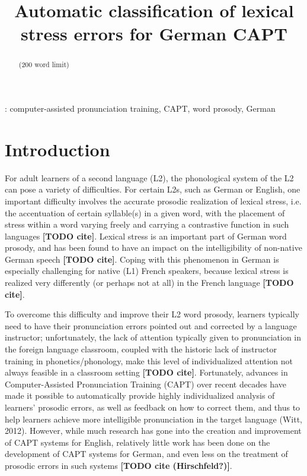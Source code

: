 \documentclass[a4paper]{article}
\title{Automatic classification of lexical stress errors for German CAPT}
\newcommand{\TODO}[1]{{\color{red}\textbf{[TODO #1]}}}
\begin{document}
  \maketitle
  \begin{abstract}
  
    (200 word limit) 
  
    
    
    
  \end{abstract}
  : computer-assisted pronunciation training, CAPT, word prosody, German


  \section{Introduction}
  
  \cite{Vakil2015}
  
  For adult learners of a second language (L2), the phonological system of the L2 can pose a variety of difficulties. For certain L2s, such as German or English, one important difficulty involves the accurate prosodic realization of lexical stress, i.e. the accentuation of certain syllable(s) in a given word, with the placement of stress within a word varying freely and carrying a contrastive function in such languages \TODO{cite}. Lexical stress is an important part of German word prosody, and has been found to have an impact on the intelligibility of non-native German speech \TODO{cite}. Coping with this phenomenon in German is especially challenging for native (L1) French speakers, because lexical stress is realized very differently (or perhaps not at all) in the French language \TODO{cite}.
  
  To overcome this difficulty and improve their L2 word prosody, learners typically need to have their pronunciation errors pointed out and corrected by a language instructor; unfortunately, the lack of attention typically given to pronunciation in the foreign language classroom, coupled with the historic lack of instructor training in phonetics/phonology, make this level of individualized attention not always feasible in a classroom setting \TODO{cite}. Fortunately, advances in Computer-Assisted Pronunciation Training (CAPT) over recent decades have made it possible to automatically provide highly individualized analysis of learners' prosodic errors, as well as feedback on how to correct them, and thus to help learners achieve more intelligible pronunciation in the target language (Witt, 2012). However, while much research has gone into the creation and improvement of CAPT systems for English, relatively little work has been done on the development of CAPT systems for German, and even less on the treatment of prosodic errors in such systems \TODO{cite (Hirschfeld?)}.
  
\end{document}

